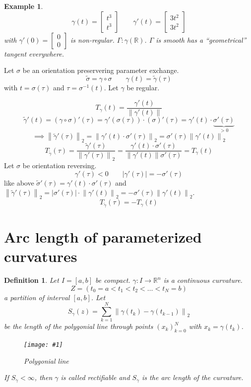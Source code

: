 \documentclass{article}
\newtheorem{example}{Example}  \numberwithin{example}{section}
\newtheorem{definition}{Definition}  \numberwithin{definition}{section}
\newcommand{\pic}[2]{%
 \begin{figure}[t]
  \begin{center}
   \texttt{[image: \#1]}
   \caption{#2}
  \end{center}
 \end{figure}
}
\newcommand{\norm}[1]{\left\|#1\right\|}
\newcommand{\card}[1]{\left|#1\right|}
\begin{document}
\begin{example}
  \[ \gamma(t) = \begin{bmatrix} t^3 \\ t^3 \end{bmatrix} \qquad \gamma'(t) = \begin{bmatrix} 3t^2 \\ 3t^2 \end{bmatrix} \]
  with $\gamma'(0) = \begin{bmatrix} 0 \\ 0 \end{bmatrix}$ is non-regular. $\Gamma: \gamma(\mathbb R)$. %
  $\Gamma$ is smooth has a \enquote{geometrical} tangent everywhere.
\end{example}

Let $\sigma$ be an orientation preservering parameter exchange.
\[ \tilde\sigma = \gamma \circ \sigma \qquad \gamma(t) = \tilde\gamma(\tau) \]
with $t = \sigma(\tau)$ and $\tau = \sigma^{-1}(t)$. Let $\gamma$ be regular.

\[ T_{\gamma}(t) = \frac{\gamma'(t)}{\norm{\gamma'(t)}} \]
\[ \tilde\gamma'(t) = (\gamma \circ \sigma)'(\tau) = \gamma'(\sigma(\tau)) \cdot (\sigma)'(\tau) = \gamma'(t) \cdot \underbrace{\sigma'(\tau)}_{> 0} \]
\[ \implies \norm{\tilde\gamma'(\tau)}_2 = \norm{\gamma'(t) \cdot \sigma'(\tau)}_2 = \sigma'(\tau) \norm{\gamma'(t)}_2 \]
\[ T_{\tilde\gamma}(\tau) = \frac{\tilde\gamma'(\tau)}{\norm{\gamma'(\tau)}_2} = \frac{\gamma'(t) \cdot \sigma'(\tau)}{\norm{\gamma'(t)} \sigma'(\tau)} = T_{\gamma}(t) \]
Let $\sigma$ be orientation reversing.
\[ \gamma'(\tau) < 0 \qquad \card{\gamma'(\tau)} = -\sigma'(\tau) \]
like above $\tilde\sigma'(\tau) = \gamma'(t) \cdot \sigma'(\tau)$ and $\norm{\tilde\gamma'(\tau)}_2 = \card{\sigma'(\tau)} \cdot \norm{\gamma'(t)}_2 = -\sigma'(\tau) \norm{\gamma'(t)}_2$.
\[ T_{\tilde\gamma}(\tau) = -T_{\gamma}(t) \]


\section{Arc length of parameterized curvatures}
\begin{definition} %
  Let $I = [a,b]$ be compact. $\gamma: I \to \mathbb R^n$ is a continuous curvature.
  \[ Z = (t_0 = a < t_1 < t_2 < \dots < t_N = b) \]
  a partition of interval $[a,b]$. Let 
  \[ S_\gamma(z) = \sum_{k=1}^N \norm{\gamma(t_k) - \gamma(t_{k-1})}_2 \]
  be the length of the polygonial line through points $(x_k)_{k=0}^N$ with $x_k = \gamma(t_k)$.

  \pic{img/46_polygonial_line.pdf}{Polygonial line}

  If $S_{\gamma} < \infty$, then $\gamma$ is called \emph{rectifiable}
  and $S_{\gamma}$ is the \emph{arc length of the curvature}.
\end{definition}
\end{document}

